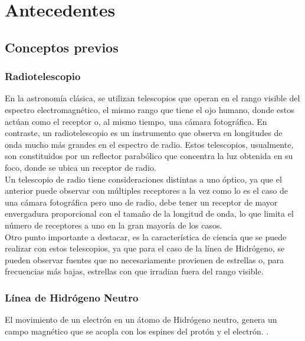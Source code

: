 \chapter{Antecedentes}
\section{Conceptos previos}
\subsection{Radiotelescopio}

En la astronomía clásica, se utilizan telescopios que operan en el rango visible del espectro electromagnético, el mismo rango que tiene el ojo humano, donde estos actúan como el receptor o, al mismo tiempo, una cámara fotográfica. En contraste, un radiotelescopio es un instrumento que observa en longitudes de onda mucho más grandes en el espectro de radio. Estos telescopios, usualmente, son constituidos por un reflector parabólico que concentra la luz obtenida en su foco, donde se ubica un receptor de radio.\\

Un telescopio de radio tiene consideraciones distintas a uno óptico, ya que el anterior puede observar con múltiples receptores a la vez como lo es el caso de una cámara fotográfica pero uno de radio, debe tener un receptor de mayor envergadura proporcional con el tamaño de la longitud de onda, lo que limita el número de receptores a uno en la gran mayoría de los casos.\\

Otro punto importante a destacar, es la característica de ciencia que se puede realizar con estos telescopios, ya que para el caso de la línea de Hidrógeno, se pueden observar fuentes que no necesariamente provienen de estrellas o, para frecuencias más bajas, estrellas con que irradian fuera del rango visible.

\subsection{Línea de Hidrógeno Neutro}

El movimiento de un electrón en un átomo de Hidrógeno neutro, genera un campo magnético que se acopla con los espines del protón y el electrón.  \cite{Restrepo2023}.\\

